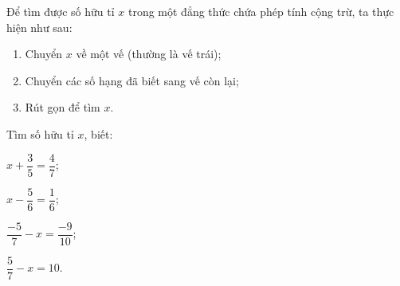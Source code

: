 \begin{dang}
	Để tìm được số hữu tỉ $x$ trong một đẳng thức chứa phép tính cộng trừ, ta thực hiện như sau:
	\begin{enumerate}[\tickEX]
		\item Chuyển $x$ về một vế (thường là vế trái);
		\item Chuyển các số hạng đã biết sang vế còn lại;
		\item Rút gọn để tìm $x$.
	\end{enumerate}
\end{dang}
\begin{vd}
	Tìm số hữu tỉ $x$, biết:
	\begin{listEX}[2]
		\item $x+\dfrac{3}{5}=\dfrac{4}{7}$;
		\item $x-\dfrac{5}{6}=\dfrac{1}{6}$;
		\item $\dfrac{-5}{7}-x=\dfrac{-9}{10}$;
		\item $\dfrac{5}{7}-x=10$.
	\end{listEX}
\end{vd}

